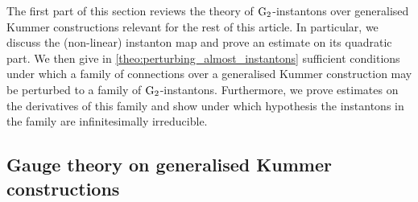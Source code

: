 \documentclass[11pt,a4paper]{scrartcl}
\newcommand{\G}{\textup{G}}
\numberwithin{equation}{section}
\theoremstyle{plain}
\theoremstyle{definition}
\theoremstyle{remark}
\begin{document}
The first part of this section reviews the theory of $\G_2$-instantons over generalised Kummer constructions relevant for the rest of this article. In particular, we discuss the (non-linear) instanton map and prove an estimate on its quadratic part. We then give in \autoref{theo:perturbing_almost_instantons} sufficient conditions under which a family of connections over a generalised Kummer construction may be perturbed to a family of $\G_2$-instantons. Furthermore, we prove estimates on the derivatives of this family and show under which hypothesis the instantons in the family are infinitesimally irreducible.



\subsection{Gauge theory on generalised Kummer constructions}\label{subsec: gauge theory on Kummer}
\end{document}
